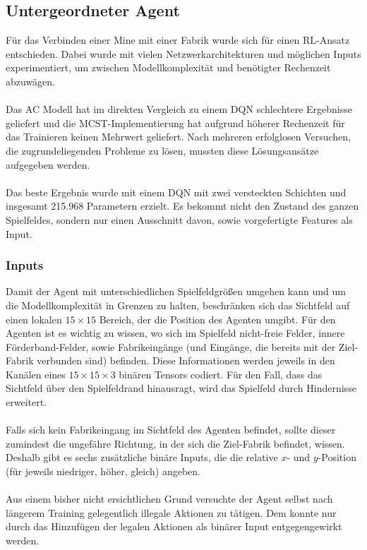 \subsection{Untergeordneter Agent}
Für das Verbinden einer Mine mit einer Fabrik wurde sich für einen RL-Ansatz entschieden. Dabei wurde mit vielen Netzwerkarchitekturen und möglichen Inputs experimentiert, um zwischen Modellkomplexität und benötigter Rechenzeit abzuwägen. 
\\\\
Das AC Modell hat im direkten Vergleich zu einem DQN schlechtere Ergebnisse geliefert und die MCST-Implementierung hat aufgrund höherer Rechenzeit für das Trainieren keinen Mehrwert geliefert. Nach mehreren erfolglosen Versuchen, die zugrundeliegenden Probleme zu lösen, mussten diese Lösungsansätze aufgegeben werden.
\\\\
Das beste Ergebnis wurde mit einem DQN mit zwei versteckten Schichten und insgesamt 215.968 Parametern erzielt. Es bekommt nicht den Zustand des ganzen Spielfeldes, sondern nur einen Ausschnitt davon, sowie vorgefertigte Features als Input.
\subsubsection*{Inputs}
Damit der Agent mit unterschiedlichen Spielfeldgrößen umgehen kann und um die Modellkomplexität in Grenzen zu halten, beschränken sich das Sichtfeld auf einen lokalen $15\times15$ Bereich, der die Position des Agenten umgibt. 
Für den Agenten ist es wichtig zu wissen, wo sich im Spielfeld nicht-freie Felder, innere Förderband-Felder, sowie Fabrikeingänge (und Eingänge, die bereits mit der Ziel-Fabrik verbunden sind) befinden. Diese Informationen werden jeweils in den Kanälen eines  $15\times15\times3$ binären Tensors codiert. 
Für den Fall, dass das Sichtfeld über den Spielfeldrand hinausragt, wird das Spielfeld durch Hindernisse erweitert.
\\\\
Falls sich kein Fabrikeingang im Sichtfeld des Agenten befindet, sollte dieser zumindest die ungefähre Richtung, in der sich die Ziel-Fabrik befindet, wissen. Deshalb gibt es sechs zusätzliche binäre Inputs, die die relative $x$- und $y$-Position (für jeweils niedriger, höher, gleich) angeben.
\\\\
Aus einem bisher nicht ersichtlichen Grund versuchte der Agent selbst nach längerem Training gelegentlich illegale Aktionen zu tätigen. Dem konnte nur durch das Hinzufügen der legalen Aktionen als binärer Input entgegengewirkt werden.



